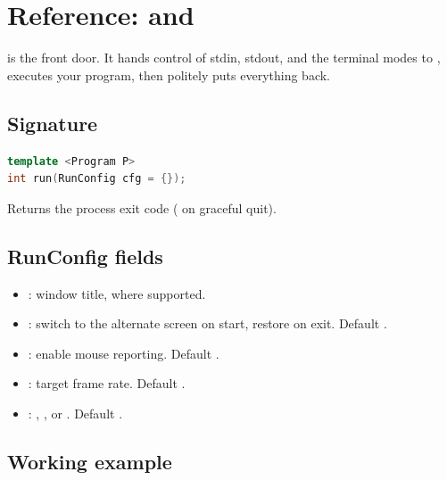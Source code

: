 \chapter{Reference:  and }
\label{ch:refman-run}

\begin{aside}
 is the front door. It hands control of stdin,
stdout, and the terminal modes to \maya{}, executes your
program, then politely puts everything back.
\end{aside}

\section{Signature}

\begin{lstlisting}[language=C++]
template <Program P>
int run(RunConfig cfg = {});
\end{lstlisting}

\noindent Returns the process exit code ( on
graceful quit).

\section{RunConfig fields}

\begin{itemize}[leftmargin=*]
  \item {}: window title, where supported.
  \item {}: switch to the alternate screen
    on start, restore on exit. Default .
  \item {}: enable mouse reporting. Default
    .
  \item {}: target frame rate. Default .
  \item {}: , , or
    . Default .
\end{itemize}

\section{Working example}

